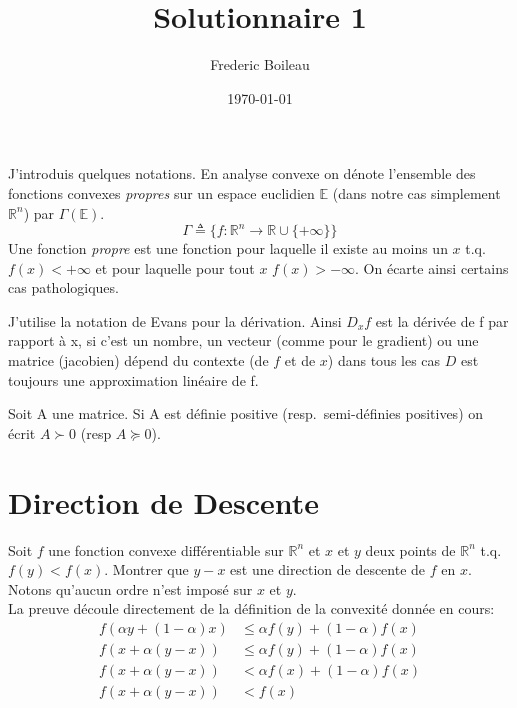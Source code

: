 

\renewcommand{\familydefault}{\sfdefault}
\usepackage{titling}
\usepackage[backend=biber,citestyle=authoryear,style=ieee]{biblatex}
\usepackage{amsmath}
\usepackage{fancyhdr}
\pagestyle{fancy}

\title{Solutionnaire 1}
\author{Frederic Boileau}
\date{\today}




\fancyhf{}
\maketitle
\thispagestyle{fancy}

J'introduis quelques notations. En analyse convexe on dénote l'ensemble
des fonctions convexes \emph{propres} sur un espace euclidien $\mathbb E$
(dans notre cas simplement $\mathbb R^n$) par $\Gamma (\mathbb E)$.
\begin{equation*}
    \Gamma \triangleq \{f : \mathbb R^n \rightarrow \mathbb R \cup \{+\infty\}\}
\end{equation*}
Une fonction \emph{propre} est une fonction pour laquelle il existe au moins un
$x$ t.q. $f(x) < + \infty $ et pour laquelle pour tout $x$ $f(x) > -\infty$. 
On écarte ainsi certains cas pathologiques.

J'utilise la notation de Evans pour la d\'erivation. Ainsi $D_x f$ 
est la d\'eriv\'ee de f par rapport \`a x, si c'est un nombre, un vecteur
(comme pour le gradient) ou une matrice (jacobien) d\'epend du contexte
(de $f$ et de $x$) dans tous les cas $D$ est toujours une approximation
linéaire de f. 

Soit A une matrice. Si A est d\'efinie positive  (resp.\  semi-d\'efinies
positives) on \'ecrit $A \succ 0$ (resp $A \succeq 0$).

\section{Direction de Descente}

Soit $f$ une fonction convexe différentiable sur $\mathbb R^n$ 
et $x$ et $y$ deux points de $\mathbb R^n$ t.q. $f(y) < f(x)$.
Montrer que $y-x$ est une direction de descente de $f$ en $x$.
Notons qu'aucun ordre n'est impos\'e  sur $x$ et $y$.\\

La preuve d\'ecoule directement de la d\'efinition de la 
convexit\'e donn\'ee en cours:
\begin{align*}
    f(\alpha y + (1-\alpha)x) &\leq \alpha f(y) + (1-\alpha)f(x)\\
    f(x + \alpha(y-x)) &\leq \alpha f(y) + (1-\alpha)f(x)\\
    f(x + \alpha(y-x)) &< \alpha f(x) + (1-\alpha)f(x)\\
    f(x + \alpha(y-x)) &< f(x)
\end{align*}

